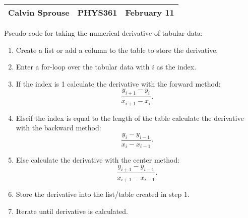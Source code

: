 \documentclass[a4paper, 12pt]{config/homework}
\begin{document}
\noindent
\begin{tabularx}{\textwidth}{>{\centering\arraybackslash}X>{\centering\arraybackslash}X>{\centering\arraybackslash}X}
Calvin Sprouse & PHYS361 & 2024 February 11\\
\midrule
\end{tabularx}

\noindent
Pseudo-code for taking the numerical derivative of tabular data:
\begin{enumerate}
\item Create a list or add a column to the table to store the derivative.
\item Enter a for-loop over the tabular data with \(i\) as the index.
\item If the index is 1 calculate the derivative with the forward method:
\[\frac{y_{i+1}-y_i}{x_{i+1}-x_i}.\]
\item Elseif the index is equal to the length of the table calculate the derivative with the backward method:
\[\frac{y_{i} - y_{i-1}}{x_i - x_{i-1}}.\]
\item Else calculate the derivative with the center method:
\[\frac{y_{i+1} - y_{i-1}}{x_{i+1} - x_{i-1}}.\]
\item Store the derivative into the list/table created in step 1.
\item Iterate until derivative is calculated.
\end{enumerate}
\end{document}

